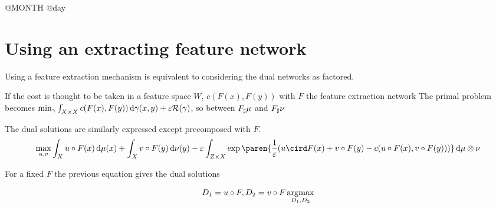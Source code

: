 \documentclass[11pt,a4paper]{article}
\begin{document}

{\Huge @MONTH @day}

\section*{Using an extracting feature network}
    Using a feature extraction mechanism is equivalent to considering the dual networks as factored.

    If the cost is thought to be taken in a feature space $W$, $c(F(x),
    F(y))$ with $F$ the feature extraction network
    The primal problem becomes
    $\min_{\gamma}\int_{{X \times X}}c(F(x), F(y)) \, \mathrm{d} \gamma (x,y) + \varepsilon \mathcal{R}(\gamma)$, so between ${F}_{\sharp}{\mu}$ and ${F}_{\sharp}{\nu}$

    The dual solutions are similarly expressed except precomposed with $F$.
    \begin{equation}
        \max_{u, v} \int_{X} u \circ F (x) \d \mu(x) + \int_{X} v \circ F(y) \d \nu(y) - \eps \int_{\ZX}{\exp{\paren{ \frac{1}{\eps} ( u \cird F (x) + v \circ F (y)  - c( u \circ F(x), v \circ F(y)))}} \d \muxnu}
    \end{equation}

    For a fixed $F$ the previous equation gives the dual solutions

\begin{equation}
    D_1 = u \circ F, D_2 = v \circ F
    \operatorname*{\arg\!\max}_{D_1,D_2}
\end{equation}
\end{document}

